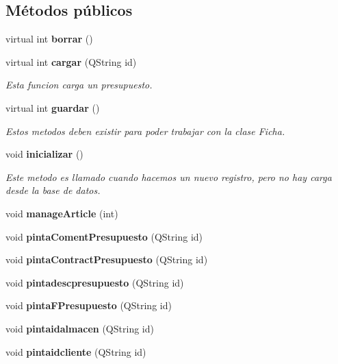\subsection*{M\'{e}todos p\'{u}blicos}
\begin{CompactItemize}
\item 
virtual int {\bf borrar} ()\label{classPresupuestoView_a0}

\item 
virtual int {\bf cargar} (QString id)
\begin{CompactList}\small\item\em Esta funcion carga un presupuesto. \item\end{CompactList}\item 
virtual int {\bf guardar} ()
\begin{CompactList}\small\item\em Estos metodos deben existir para poder trabajar con la clase Ficha. \item\end{CompactList}\item 
void {\bf inicializar} ()\label{classPresupuestoView_a3}

\begin{CompactList}\small\item\em Este metodo es llamado cuando hacemos un nuevo registro, pero no hay carga desde la base de datos. \item\end{CompactList}\item 
void {\bf manage\-Article} (int)\label{classPresupuestoView_a4}

\item 
void {\bf pinta\-Coment\-Presupuesto} (QString id)\label{classPresupuestoView_a5}

\item 
void {\bf pinta\-Contract\-Presupuesto} (QString id)\label{classPresupuestoView_a6}

\item 
void {\bf pintadescpresupuesto} (QString id)\label{classPresupuestoView_a7}

\item 
void {\bf pinta\-FPresupuesto} (QString id)\label{classPresupuestoView_a8}

\item 
void {\bf pintaidalmacen} (QString id)\label{classPresupuestoView_a9}

\item 
void {\bf pintaidcliente} (QString id)\label{classPresupuestoView_a10}


\end{CompactItemize}
